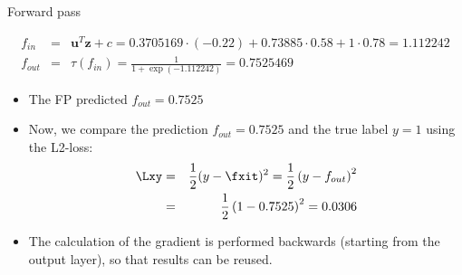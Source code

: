 \begin{vbframe}{ Forward pass}
\vspace*{-0.5cm}

  \begin{footnotesize}
    \begin{eqnarray*}
    f_{in} &=& \bm{u}^T \bm{z} + c = \num[round-mode=places,round-precision=4]{0.3705169} \cdot (-0.22) + \num[round-mode=places,round-precision=4]{0.73885} \cdot 0.58 + 1 \cdot 0.78 = \num[round-mode=places,round-precision=4]{1.112242} \\
    f_{out} &=& \tau\left(f_{in}\right) = \frac{1}{1+\exp(\num[round-mode=places,round-precision=4]{-1.112242})} = \num[round-mode=places,round-precision=4]{0.7525469}
    \end{eqnarray*}
  \end{footnotesize}
\framebreak

  \begin{itemize}
    \item The FP predicted $f_{out} = 0.7525$
    \item Now, we compare the prediction $f_{out} = 0.7525$ and the true label $y = 1$ using the L2-loss: 
      \begin{eqnarray*}
        \Lxy &=& \frac{1}{2}(y - \fxit)^2 = \frac{1}{2}\left(y - f_{out}\right)^{2} \\
                  &=& \frac{1}{2}\left(1 - \num[round-mode=places,round-precision=4]{0.7525469}\right)^2 = \num[round-mode=places,round-precision=4]{0.03061652}
      \end{eqnarray*}
    \item The calculation of the gradient is performed backwards (starting from the output layer), so that results can be reused. 
\end{itemize}
\end{vbframe}

